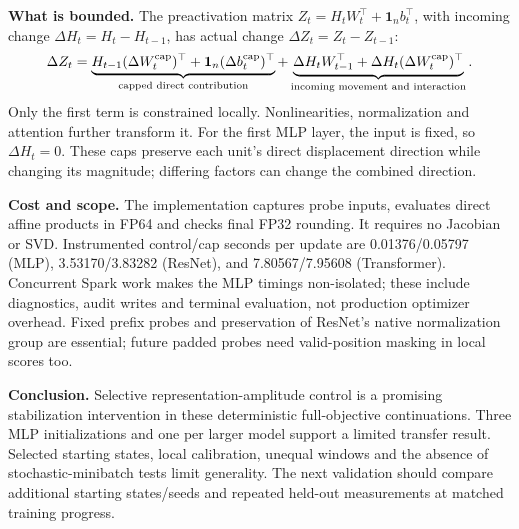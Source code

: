 \documentclass[11pt,a4paper]{article}
\begin{document}
\textbf{What is bounded.} The preactivation matrix
$Z_t=H_tW_t^\top+\mathbf1_n b_t^\top$, with incoming change
$\Delta H_t=H_t-H_{t-1}$, has actual change $\Delta Z_t=Z_t-Z_{t-1}$:
\begin{equation}
 \Delta Z_t=\underbrace{H_{t-1}(\Delta W_t^{\rm cap})^\top+\mathbf1_n(\Delta b_t^{\rm cap})^\top}_{\text{capped direct contribution}}
 +\underbrace{\Delta H_tW_{t-1}^\top+\Delta H_t(\Delta W_t^{\rm cap})^\top}_{\text{incoming movement and interaction}}.
\end{equation}
Only the first term is constrained locally. Nonlinearities, normalization and
attention further transform it. For the first MLP layer, the input is fixed,
so $\Delta H_t=0$. These caps preserve each unit's direct displacement direction
while changing its magnitude; differing factors can change the combined direction.

\textbf{Cost and scope.} The implementation captures probe inputs, evaluates
direct affine products in FP64 and checks final FP32 rounding. It requires no
Jacobian or SVD. Instrumented control/cap seconds per update are 0.01376/0.05797
(MLP), 3.53170/3.83282 (ResNet), and 7.80567/7.95608 (Transformer). Concurrent
Spark work makes the MLP timings non-isolated; these include diagnostics, audit
writes and terminal evaluation, not production optimizer overhead. Fixed prefix
probes and preservation of ResNet's native normalization group are essential;
future padded probes need valid-position masking in local scores too.

\textbf{Conclusion.} Selective representation-amplitude control is a promising
stabilization intervention in these deterministic full-objective continuations.
Three MLP initializations and one per larger model support a limited transfer
result. Selected starting states, local calibration, unequal windows and the absence of
stochastic-minibatch tests limit generality. The next validation should compare
additional starting states/seeds and repeated held-out measurements at matched training progress.
\end{document}
